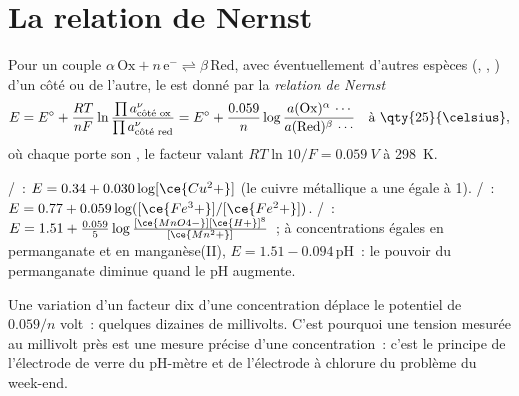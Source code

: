 \section{La relation de Nernst}

\begin{theorem}\label{thm:b1:nernst:nernst}
Pour un couple $\alpha\,\mathrm{Ox} + n\,\mathrm{e^-} \rightleftharpoons
\beta\,\mathrm{Red}$, avec éventuellement d'autres espèces (,
, ) d'un côté ou de l'autre, le  est
donné par la \emph{relation de Nernst}
\[
  E = E^\circ + \frac{RT}{nF}\ln\frac{\prod a_{\text{côté ox}}^{\nu}}{\prod
  a_{\text{côté red}}^{\nu}}
  = E^\circ + \frac{0.059}{n}\log\frac{a(\mathrm{Ox})^\alpha\,\cdots}{a(\mathrm{Red})^\beta\,\cdots}
  \quad\text{à \qty{25}{\celsius}},
\]
où chaque  porte son , le facteur valant
$RT\ln 10/F = \qty{0.059}{V}$ à \qty{298}{K}.
\end{theorem}


\begin{example}\label{ex:b1:nernst:examples}
/~: $E = 0.34 + 0.030\log[\ce{Cu^2+}]$ (le cuivre
métallique a une  égale à 1).
/~: $E = 0.77 + 0.059\log([\ce{Fe^3+}]/[\ce{Fe^2+}])$.
/~: $E = 1.51 + \frac{0.059}{5}\log
\frac{[\ce{MnO4-}][\ce{H+}]^8}{[\ce{Mn^2+}]}$~; à concentrations égales
en permanganate et en manganèse(II), $E = 1.51 - 0.094\,\mathrm{pH}$~: le
pouvoir  du permanganate diminue quand le pH augmente.
\end{example}

Une variation d'un facteur dix d'une concentration déplace le potentiel
de $0.059/n$ volt~: quelques dizaines de millivolts. C'est pourquoi une
tension mesurée au millivolt près est une mesure précise d'une
concentration~: c'est le principe de l'électrode de verre du pH-mètre et
de l'électrode à chlorure du problème du week-end.

